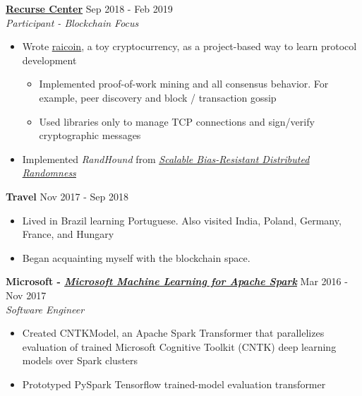 \documentclass[overlapped]{res}
\begin{document}
\begin{resume}
    \href{https://www.recurse.com/}{\underline{\bf Recurse Center}} \hfill Sep 2018 - Feb 2019 \\
    {\em Participant\/ - Blockchain Focus}
    \begin{itemize} \itemsep-2pt
        \item
          Wrote \href{https://www.github.com/ratanrsur/raicoin}{\underline{raicoin}}, a toy cryptocurrency, as a project-based way to learn protocol development
        \begin{itemize} \itemsep-2pt
          \item
            Implemented proof-of-work mining and all consensus behavior. For example, peer discovery and block / transaction gossip
          \item Used libraries only to manage TCP connections and sign/verify cryptographic messages
        \end{itemize}

      \item Implemented {\em RandHound\/} from \href{Scalable Bias-Resistant Distributed Randomness}{\underline{{\em Scalable Bias-Resistant Distributed Randomness\/}}}
    \end{itemize}

    {\bf Travel} \hfill Nov 2017 - Sep 2018
    \begin{itemize} \itemsep-2pt
        \item
            Lived in Brazil learning Portuguese. Also visited India, Poland, Germany, France, and Hungary
        \item Began acquainting myself with the blockchain space.
    \end{itemize}


    {\bf Microsoft - \href{https://www.github.com/Azure/mmlspark}{\underline{\em Microsoft Machine Learning for Apache Spark}}} \hfill Mar 2016 - Nov 2017 \\
    {\em Software Engineer}
    \begin{itemize} \itemsep-2pt
        \item
          Created CNTKModel, an Apache Spark Transformer that parallelizes evaluation of trained Microsoft Cognitive Toolkit (CNTK) deep learning models over Spark clusters
        \item
          Prototyped PySpark Tensorflow trained-model evaluation transformer
    \end{itemize}


\end{resume}
\end{document}
